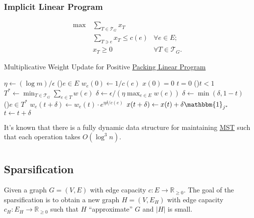 \subsection{Implicit Linear Program}
\[
	\begin{aligned}
		\max~ & \sum_{T \in \mathcal{T} _G} x_T                                 \\
		      & \sum_{T \ni e} x_T \leq c(e)    & \forall e \in E ;             \\
		      & x_T \geq 0                      & \forall T \in \mathcal{T} _G.
	\end{aligned}
\]

\begin{algorithm}[H]\label{algo:MWU-discrete-tree-packing}
	\DontPrintSemicolon{}
	\caption{Multiplicative Weight Update for Positive \hyperref[def:packing-LP]{Packing Linear Program}}
	\BlankLine

	\(\eta \gets (\log m) / \epsilon \)\;
	\For(){\(e \in E\)}{
		\(w_e(0) \gets 1 / c(e)\)\;
	}
	\(x(0) = 0\)
	\(t = 0\)\;
	\;
	\While(){\(t < 1\)}{
	\(T ^{\ast} \gets \min _{T \in \mathcal{T} _{G}} \sum_{e \in T} w(e)\)\;
	\(\delta \gets \epsilon / (\eta \max _{e \in E} w(e))\)
	\(\delta \gets \min (\delta , 1 - t)\)
	\For(){\(e \in T^{\ast} \)}{
		\(w_e(t+\delta ) \gets w_e(t) \cdot e^{\eta \delta / c(e)}\)\;
	}
	\(x (t+\delta ) \gets x (t) + \delta \mathbbm{1}_{j^{\ast} }\)\;
	\(t \gets t + \delta \)\;
	}
	\;
\end{algorithm}

It's known that there is a fully dynamic data structure for maintaining \hyperref[prb:MST]{MST} such that each operation takes \(O(\log ^3 n)\).

\chapter{}
\section{Sparsification}
Given a graph \(G = (V, E)\) with edge capacity \(c \colon E \to \mathbb{R} _{\geq 0}\). The goal of the sparsification is to obtain a new graph \(H = (V, E_H )\) with edge capacity \(c_H \colon E_H \to \mathbb{R} _{\geq 0}\) such that \(H\) ``approximate'' \(G\) and \(\lvert H \rvert \) is small.

